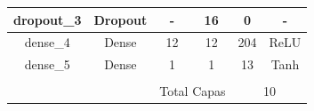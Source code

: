 \begin{table}[]
{\begin{tabular}{@{}cccccc@{}}
            \multicolumn{1}{|c|}{dropout\_3}    & \multicolumn{1}{c|}{Dropout}       & \multicolumn{1}{c|}{-}                                                                     & \multicolumn{1}{c|}{16}                                                                        & \multicolumn{1}{c|}{0}                                                                          & \multicolumn{1}{c|}{-}                                                                         \\ \midrule
            \multicolumn{1}{|c|}{dense\_4}      & \multicolumn{1}{c|}{Dense}         & \multicolumn{1}{c|}{12}                                                                    & \multicolumn{1}{c|}{12}                                                                        & \multicolumn{1}{c|}{204}                                                                        & \multicolumn{1}{c|}{ReLU}                                                                      \\ \midrule
            \multicolumn{1}{|c|}{dense\_5}      & \multicolumn{1}{c|}{Dense}         & \multicolumn{1}{c|}{1}                                                                     & \multicolumn{1}{c|}{1}                                                                         & \multicolumn{1}{c|}{13}                                                                         & \multicolumn{1}{c|}{Tanh}                                                                      \\ \midrule
                                                &                                    &                                                                                            &                                                                                                &                                                                                                 &                                                                                                \\ \cmidrule(l){3-6} 
                                                & \multicolumn{1}{c|}{}              & \multicolumn{2}{c|}{Total Capas}                                                                                                                                                            & \multicolumn{2}{c|}{10}                                                                                                                                                                          \\ \cmidrule(l){3-6} 

\end{tabular}}
\end{table}
